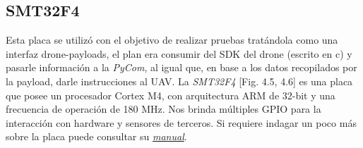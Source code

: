 \documentclass[12pt]{article}
\begin{document}
\subsection{SMT32F4}
Esta placa se utilizó con el objetivo de realizar pruebas tratándola como una interfaz drone-payloads, el plan era consumir del SDK del drone (escrito en c) y pasarle información a la \textit{PyCom}, al igual que, en base a los datos recopilados por la payload, darle instrucciones al UAV.
La \textit{SMT32F4} [Fig. 4.5, 4.6] es una placa que posee un procesador Cortex M4, con arquitectura ARM de 32-bit y una frecuencia de operación de 180 MHz. Nos brinda múltiples GPIO para la interacción con hardware y sensores de terceros. Si requiere indagar un poco más sobre la placa puede consultar su \href{https://drive.google.com/file/d/182H9i1qmJ2UCbynztxymEA3nfmx_eGrk/view?usp=share_link}{\textit{manual}}.
\end{document}
